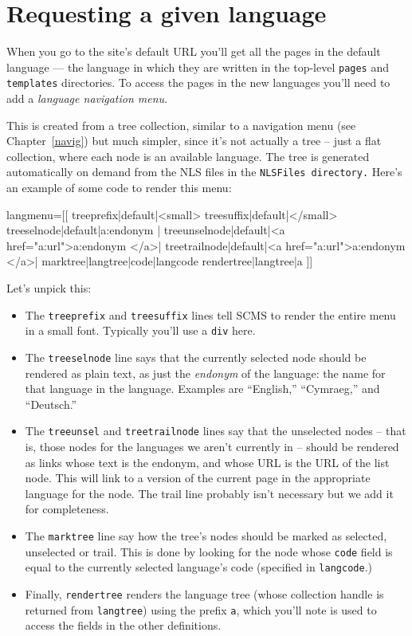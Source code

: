 \section{Requesting a given language}When you go to the site's default URL you'll get all the pages in the default language ---
the language in which they are written in the top-level \texttt{pages} and \texttt{templates} directories.
To access the pages in the new languages you'll need to add a \emph{language navigation menu}.

This is created from a tree collection, similar to a navigation menu (see Chapter~\ref{navig}) but much simpler, since it's 
not actually a tree -- just a flat collection, where each node is an available language. The tree is generated automatically on demand
from the NLS files in the \texttt{NLSFiles directory.} 
Here's an example of some code to render this menu:
\begin{MyVerbatim}
langmenu=[[
{{treeprefix|default|<small>}}
{{treesuffix|default|</small>}}
{{treeselnode|default|{{a:endonym}} |}}
{{treeunselnode|default|<a href="{{a:url}}">{{a:endonym}} </a>|}}
{{treetrailnode|default|<a href="{{a:url}}">{{a:endonym}} </a>|}}
{{marktree|{{langtree}}|code|{{langcode}}}}
{{rendertree|{{langtree}}|a}}
]]
\end{MyVerbatim}
Let's unpick this:
\begin{itemize}
\item The \texttt{treeprefix} and \texttt{treesuffix} lines tell SCMS to render the entire menu in a small font. Typically you'll
use a \texttt{div} here.
\item The \texttt{treeselnode} line says that the currently selected node should be rendered as plain text, as just the \emph{endonym} of the language: the
name for that language in the language. Examples are ``English,'' ``Cymraeg,'' and ``Deutsch.''
\item The \texttt{treeunsel} and \texttt{treetrailnode} lines say that the unselected nodes -- that is, those nodes for the languages we aren't currently in --
should be rendered as links whose text is the endonym, and whose URL is the URL of the list node. This will link to a version of the current page in the appropriate
language for the node. The trail line probably isn't necessary but we add
it for completeness.
\item The \texttt{marktree} line say how the tree's nodes should be marked as selected, unselected or trail. This is done by looking for the node whose \texttt{code} field
is equal to the currently selected language's code (specified in \texttt{langcode}.)
\item Finally, \texttt{rendertree} renders the language tree (whose collection handle is returned from \texttt{langtree}) using the prefix \texttt{a}, which you'll
note is used to access the fields in the other definitions.
\end{itemize}


